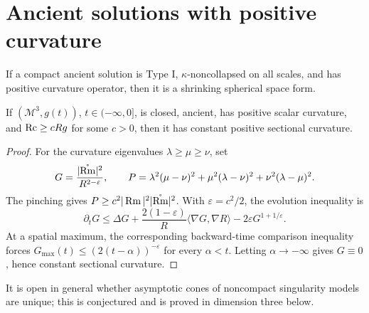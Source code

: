 \section{Ancient solutions with positive curvature}

\begin{theorem}
\label{thm:chow-iv-type-i-pco}

If a compact ancient solution is Type I, \(\kappa\)-noncollapsed on all
scales, and has positive curvature operator, then it is a shrinking spherical
space form.
\end{theorem}

\begin{theorem}
\label{thm:chow-iv-3d-pinched-ricci}

If \((\mathcal M^3,g(t))\), \(t\in(-\infty,0]\), is closed, ancient, has
positive scalar curvature, and \(\operatorname{Rc}\ge cRg\) for some \(c>0\), then it has
constant positive sectional curvature.
\end{theorem}
\begin{proof}
\sketch
For the curvature eigenvalues \(\lambda\ge\mu\ge\nu\), set
\[
 G=\frac{|\mathring{\operatorname{Rm}}|^2}{R^{2-\varepsilon}},\qquad
 P=\lambda^2(\mu-\nu)^2+\mu^2(\lambda-\nu)^2+\nu^2(\lambda-\mu)^2.
\]
The pinching gives \(P\ge c^2|\operatorname{Rm}|^2|\mathring{\operatorname{Rm}}|^2\).  With
\(\varepsilon=c^2/2\), the evolution inequality is
\[
 \partial_tG\le\Delta G+\frac{2(1-\varepsilon)}R\langle\nabla G,\nabla R\rangle
 -2\varepsilon G^{1+1/\varepsilon}.
\]
At a spatial maximum, the corresponding backward-time comparison inequality
forces \(G_{\max}(t)\le(2(t-\alpha))^{-\varepsilon}\) for every
\(\alpha< t\).  Letting \(\alpha\to-\infty\) gives \(G\equiv0\), hence
constant sectional curvature.
\end{proof}

\begin{remark}[Problems 28.17--28.18]
\label{rem:chow-iv-asymptotic-cone-problems}
It is open in general whether asymptotic cones of noncompact singularity
models are unique; this is conjectured and is proved in dimension three below.
\end{remark}

